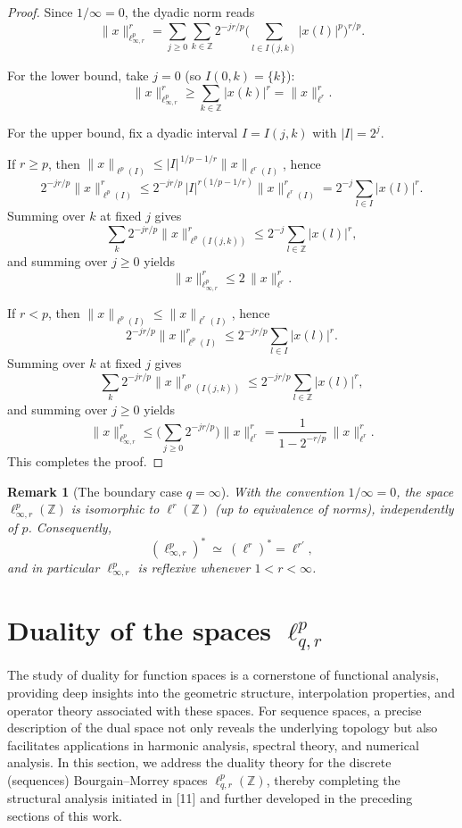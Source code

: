 \documentclass[preprint,12pt]{elsarticle}
\newtheorem{remark}[theorem]{Remark}
\begin{document}
\begin{proof}
Since $1/\infty=0$, the dyadic norm reads
\[
\|x\|_{\ell^{p}_{\infty,r}}^{r}
=\sum_{j\ge0}\sum_{k\in\mathbb Z} 2^{-jr/p}\Big(\sum_{l\in I(j,k)}|x(l)|^{p}\Big)^{r/p}.
\]

For the lower bound, take $j=0$ (so $I(0,k)=\{k\}$):
\[
\|x\|_{\ell^{p}_{\infty,r}}^{r} \ge \sum_{k\in\mathbb Z} |x(k)|^{r}=\|x\|_{\ell^r}^{r}.
\]

For the upper bound, fix a dyadic interval $I=I(j,k)$ with $|I|=2^j$.

If $r\ge p$, then $\|x\|_{\ell^p(I)}\le |I|^{\,1/p-1/r}\|x\|_{\ell^r(I)}$, hence
\[
2^{-jr/p}\|x\|_{\ell^p(I)}^{r}
\le 2^{-jr/p}\,|I|^{r(1/p-1/r)}\|x\|_{\ell^r(I)}^{r}
=2^{-j}\sum_{l\in I}|x(l)|^{r}.
\]
Summing over $k$ at fixed $j$ gives
\[
\sum_{k}2^{-jr/p}\|x\|_{\ell^p(I(j,k))}^{r}
\le 2^{-j}\sum_{l\in\mathbb Z}|x(l)|^{r},
\]
and summing over $j\ge0$ yields
\[
\|x\|_{\ell^{p}_{\infty,r}}^{r}\le2\,\|x\|_{\ell^r}^{r}.
\]

If $r<p$, then $\|x\|_{\ell^p(I)}\le \|x\|_{\ell^r(I)}$, hence
\[
2^{-jr/p}\|x\|_{\ell^p(I)}^{r}\le 2^{-jr/p}\sum_{l\in I}|x(l)|^{r}.
\]
Summing over $k$ at fixed $j$ gives
\[
\sum_{k}2^{-jr/p}\|x\|_{\ell^p(I(j,k))}^{r}\le 2^{-jr/p}\sum_{l\in\mathbb Z}|x(l)|^{r},
\]
and summing over $j\ge0$ yields
\[
\|x\|_{\ell^{p}_{\infty,r}}^{r}\le \Big(\sum_{j\ge0}2^{-jr/p}\Big)\|x\|_{\ell^r}^{r}
=\frac{1}{1-2^{-r/p}}\,\|x\|_{\ell^r}^{r}.
\]
This completes the proof.
\end{proof}

\begin{remark}[The boundary case $q=\infty$]\label{rem:q_infty}
With the convention $1/\infty=0$, the space $\ell^{p}_{\infty,r}(\mathbb{Z})$ is isomorphic to $\ell^{r}(\mathbb{Z})$
(up to equivalence of norms), independently of $p$. Consequently,
\[
(\ell^{p}_{\infty,r})^*\ \simeq\ (\ell^{r})^*=\ell^{r'},
\]
and in particular $\ell^{p}_{\infty,r}$ is reflexive whenever $1<r<\infty$.
\end{remark}


\section{Duality of the spaces \(\ell^{p}_{q,r}\)}

The study of duality for function spaces is a cornerstone of functional analysis, providing deep insights into the geometric structure, interpolation properties, and operator theory associated with these spaces. For sequence spaces, a precise description of the dual space not only reveals the underlying topology but also facilitates applications in harmonic analysis, spectral theory, and numerical analysis. In this section, we address the duality theory for the discrete (sequences) Bourgain–Morrey spaces \(\ell^{p}_{q,r}(\mathbb{Z})\), thereby completing the structural analysis initiated in [11] and further developed in the preceding sections of this work.
\end{document}
